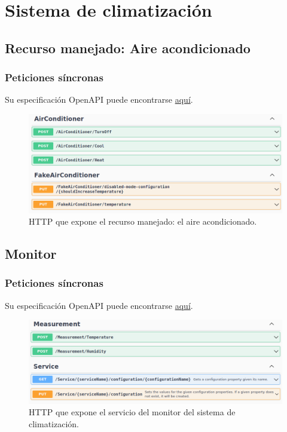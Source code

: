 \section{Sistema de climatización}

\subsection{Recurso manejado: Aire acondicionado}

\subsubsection{Peticiones síncronas}

Su especificación OpenAPI puede encontrarse \href{https://github.com/Starkie/TFM-DistributedAutoadaptiveSystems/blob/1db95346290cb55edbfd5efb717785bcd06def79/src/AutoAdaptativeSystem/Climatisation/AirConditioner/Service/Climatisation.AirConditioner.Service-OpenAPISpec.json}{aquí}.

\begin{figure}[h!]
  \hspace{-0.25cm}
  \includegraphics[scale=0.45]{anx_apis/images/apis-airconditioner}
  \caption{ HTTP que expone el recurso manejado: el aire acondicionado.}
  \label{fig:apis-eps-aireacondicionado}
\end{figure}

\subsection{Monitor}

\subsubsection{Peticiones síncronas}

Su especificación OpenAPI puede encontrarse \href{https://github.com/Starkie/TFM-DistributedAutoadaptiveSystems/blob/1db95346290cb55edbfd5efb717785bcd06def79/src/AutoAdaptativeSystem/Climatisation/Monitor/Climatisation.Monitor.Service-OpenAPISpec.json}{aquí}.

\begin{figure}[h!]
  \hspace{-0.25cm}
  \includegraphics[scale=0.45]{anx_apis/images/apis-room-monitor}
  \caption{ HTTP que expone el servicio del monitor del sistema de climatización.}
\end{figure}
